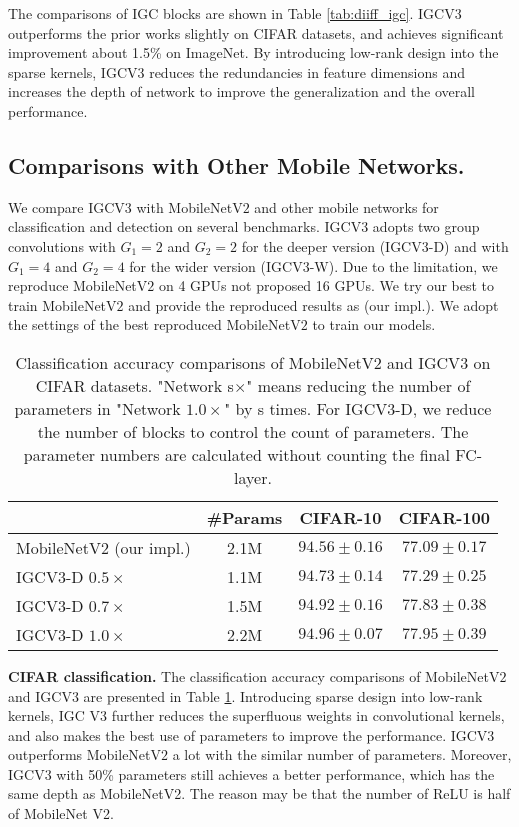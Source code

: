 \documentclass{bmvc2k}
\begin{document}
	The comparisons of IGC blocks are shown in Table \ref{tab:diiff_igc}. IGCV$3$ outperforms the prior works slightly on CIFAR datasets, and achieves significant improvement about 1.5\% on ImageNet.
	By introducing low-rank design into the sparse kernels, IGCV$3$ reduces the redundancies in feature dimensions and increases the depth of network to improve the generalization and the overall performance.
	\subsection{Comparisons with Other Mobile Networks.}
	We compare IGCV$3$ with MobileNetV$2$ and other mobile networks for classification and detection on several benchmarks. IGCV$3$ adopts two group convolutions with $G_1=2$ and $G_2=2$ for the deeper version (IGCV$3$-D) and with $G_1=4$ and $G_2=4$ for the wider version (IGCV$3$-W). Due to the limitation, we reproduce MobileNetV$2$ on 4 GPUs not proposed 16 GPUs. We try our best to train MobileNetV$2$ and provide the reproduced results as (our impl.). We adopt the settings of the best reproduced MobileNetV$2$ to train our models.
	\begin{table}[htb!]
		\centering
		\begin{tabular}{|l||c|c|c|}
			\hline
			& \#Params& CIFAR-10 & CIFAR-100\\
			\hline\hline
			MobileNetV$2$ (our impl.) & 2.1M & $94.56\pm{0.16}$ & $77.09\pm{0.17}$\\
			IGCV$3$-D $0.5\times$ & 1.1M & $94.73\pm0.14$  & $77.29\pm0.25$ \\
			IGCV$3$-D $0.7\times$ & 1.5M & $94.92\pm0.16$ & $77.83\pm0.38$ \\
			IGCV$3$-D $1.0\times$ & 2.2M & $\mathbf{94.96\pm{0.07}}$ &$\mathbf{77.95\pm0.39}$ \\
			\hline
		\end{tabular}
		\caption{Classification accuracy comparisons of MobileNetV$2$ and IGCV$3$ on CIFAR datasets. "Network s$\times$" means reducing the number of parameters in "Network $1.0\times$" by s times. For IGCV$3$-D, we reduce the number of blocks to control the count of parameters. The parameter numbers are calculated without counting the final FC-layer.}
		\label{tab:diff_mn_igcv3}
	\end{table}

	\noindent\textbf{CIFAR classification.} The classification accuracy comparisons of MobileNetV$2$ and IGCV$3$ are presented in Table \ref{tab:diff_mn_igcv3}. Introducing sparse design into low-rank kernels, IGC V3 further reduces the superfluous weights in convolutional kernels, and also makes the best use of parameters to improve the performance. IGCV$3$ outperforms MobileNetV$2$ a lot with the similar number of parameters. Moreover, IGCV$3$ with 50\% parameters still achieves a better performance, which has the same depth as MobileNetV2. The reason may be that the number of ReLU is half of MobileNet V2.
\end{document}
